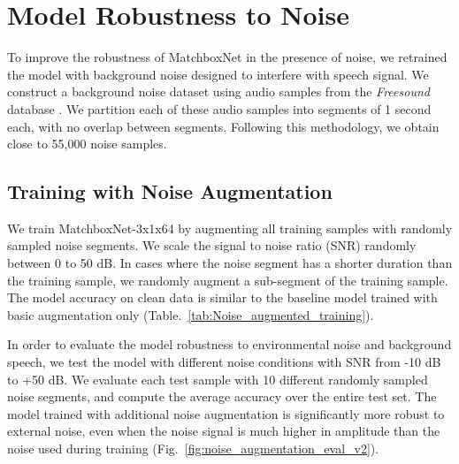\documentclass[a4paper]{article}
\begin{document}
\section{Model Robustness to Noise}
To improve the robustness of MatchboxNet in the presence of noise, we retrained the model with background noise designed to interfere with speech signal. We construct a background noise dataset using audio samples from the \textit{Freesound} database \cite{font2013freesound}.  We partition each of these audio samples into segments of 1 second each, with no overlap between segments. Following this methodology, we obtain close to 55,000 noise samples.

\subsection{Training with Noise Augmentation}
We train MatchboxNet-3x1x64 by augmenting all training samples with randomly sampled noise segments. We scale the signal to noise ratio (SNR) randomly between 0 to 50 dB. In cases where the noise segment has a shorter duration than the training sample, we randomly augment a sub-segment of the training sample. The model accuracy on clean data is similar to the baseline model trained with basic augmentation only (Table.~\ref{tab:Noise_augmented_training}).
{\renewcommand{\arraystretch}{1.1}
\begin{table}[!h]
\caption{MatchboxNet-3x1x64 trained with additional background speech and noise augmentation, Google Speech Commands dataset v2. Accuracy (\%) is averaged over 5 trials (95\% confidence interval).}
\label{tab:Noise_augmented_training}
\centering
{}
\end{table}
}

In order to evaluate the model robustness to environmental noise and background speech, we test the model with different noise conditions with SNR from -10 dB to +50 dB. We evaluate each test sample with 10 different randomly sampled noise segments, and compute the average accuracy over the entire test set. The model trained with additional noise augmentation is significantly more robust to external noise, even when the noise signal is much higher in amplitude than the noise used during training
(Fig.~\ref{fig:noise_augmentation_eval_v2}).
\end{document}
